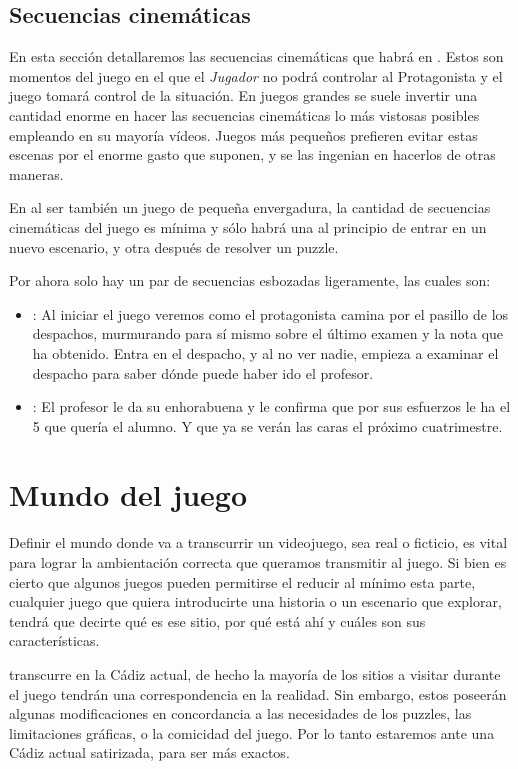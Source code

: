         
        \subsection{Secuencias cinemáticas}
        En esta sección detallaremos las secuencias cinemáticas que habrá en \nombrejuego. Estos son momentos del juego en el que el \emph{Jugador} no podrá controlar al Protagonista y el juego tomará control de la situación. En juegos grandes se suele invertir una cantidad enorme en hacer las secuencias cinemáticas lo más vistosas posibles empleando en su mayoría vídeos. Juegos más pequeños prefieren evitar estas escenas por el enorme gasto que suponen, y se las ingenian en hacerlos de otras maneras.
        
        En \nombrejuego al ser también un juego de pequeña envergadura, la cantidad de secuencias cinemáticas del juego es mínima y sólo habrá una al principio de entrar en un nuevo escenario, y otra después de resolver un puzzle. 
        
        Por ahora solo hay un par de secuencias esbozadas ligeramente, las cuales son:
        \begin{itemize}
			\item {}: Al iniciar el juego veremos como el protagonista camina por el pasillo de los despachos, murmurando para sí mismo sobre el último examen y la nota que ha obtenido. Entra en el despacho, y al no ver nadie, empieza a examinar el despacho para saber dónde puede haber ido el profesor.
			\item {}: El profesor le da su enhorabuena y le confirma que por sus esfuerzos le ha el 5 que quería el alumno. Y que ya se verán las caras el próximo cuatrimestre.	
        \end{itemize}
            
    \section{Mundo del juego}
    Definir el mundo donde va a transcurrir un videojuego, sea real o ficticio, es vital para lograr la ambientación correcta que queramos transmitir al juego. Si bien es cierto que algunos juegos pueden permitirse el reducir al mínimo esta parte, cualquier juego que quiera introducirte una historia o un escenario que explorar, tendrá que decirte qué es ese sitio, por qué está ahí y cuáles son sus características.
    
    \nombrejuego transcurre en la Cádiz actual, de hecho la mayoría de los sitios a visitar durante el juego tendrán una correspondencia en la realidad. Sin embargo, estos poseerán algunas modificaciones en concordancia a las necesidades de los puzzles, las limitaciones gráficas, o la comicidad del juego. Por lo tanto estaremos ante una Cádiz actual satirizada, para ser más exactos. 
    
